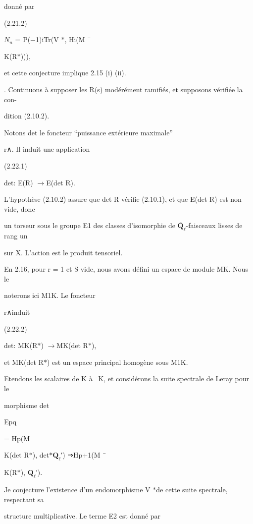 \documentclass[11pt]{article}
\begin{document}
\medskip
\noindent donné par\par
\noindent (2.21.2)\par
\noindent \(N_n\) = P(−1)iTr(V \(*\), Hi(M ¯\par
\noindent K(R\(*\)))),\par
\noindent et cette conjecture implique 2.15 (i) (ii).\par
{}. Continuons à supposer les R(s) modérément ramifiés, et supposons vérifiée la con-\par
\noindent dition (2.10.2).\par
\noindent Notons det le foncteur “puissance extérieure maximale”\par
\noindent r∧. Il induit une application\par
\noindent (2.22.1)\par
\noindent det: E(R) \(\to\)E(det R).\par
\noindent L’hypothèse (2.10.2) assure que det R vérifie (2.10.1), et que E(det R) est non vide, donc\par
\noindent un torseur sous le groupe E1 des classes d’isomorphie de \(\overline{\mathbf Q}_{\ell}\)-faisceaux lisses de rang un\par
\noindent sur X. L’action est le produit tensoriel.\par
\noindent En 2.16, pour r = 1 et S vide, nous avons défini un espace de module MK. Nous le\par
\noindent noterons ici M1K. Le foncteur\par
\noindent r∧induit\par
\noindent (2.22.2)\par
\noindent det: MK(R\(*\)) \(\to\)MK(det R\(*\)),\par
\noindent et MK(det R\(*\)) est un espace principal homogène sous M1K.\par
\noindent Etendons les scalaires de K à ¯K, et considérons la suite spectrale de Leray pour le\par
\noindent morphisme det\par
\noindent Epq\par
{} = Hp(M ¯\par
\noindent K(det R\(*\)), det\(*\)\(\mathbf Q_{\ell}\)′) ⇒Hp+1(M ¯\par
\noindent K(R\(*\)), \(\mathbf Q_{\ell}\)′).\par
\noindent Je conjecture l’existence d’un endomorphisme V \(*\)de cette suite spectrale, respectant sa\par
\noindent structure multiplicative. Le terme E2 est donné par\par
\end{document}
